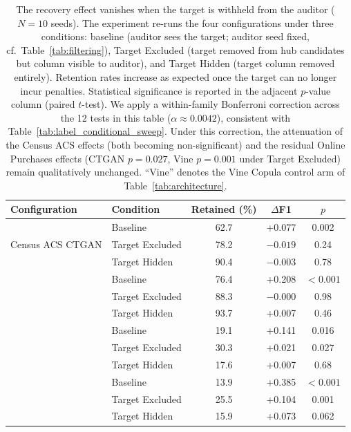 \documentclass[pdflatex,sn-mathphys-num]{sn-jnl}
\theoremstyle{thmstyleone}%
\theoremstyle{thmstyletwo}%
\theoremstyle{thmstylethree}%
\begin{document}
\begin{table}[htbp]
\centering
\caption{The recovery effect vanishes when the target is withheld from the auditor ($N=10$ seeds). The experiment re-runs the four configurations under three conditions: baseline (auditor sees the target; auditor seed fixed, cf.\ Table~\ref{tab:filtering}), Target Excluded (target removed from hub candidates but column visible to auditor), and Target Hidden (target column removed entirely). Retention rates increase as expected once the target can no longer incur penalties. Statistical significance is reported in the adjacent $p$-value column (paired $t$-test). We apply a within-family Bonferroni correction across the 12 tests in this table ($\alpha \approx 0.0042$), consistent with Table~\ref{tab:label_conditional_sweep}. Under this correction, the attenuation of the Census ACS effects (both becoming non-significant) and the residual Online Purchases effects (CTGAN $p=0.027$, Vine $p=0.001$ under Target Excluded) remain qualitatively unchanged. ``Vine'' denotes the Vine Copula control arm of Table~\ref{tab:architecture}.}
\label{tab:label_conditional_withheld}
\footnotesize
\setlength{\tabcolsep}{5pt}
\begin{tabular}{@{}llccc@{}}
\toprule
Configuration & Condition & Retained (\%) & $\Delta$F1 & $p$ \\
\midrule
\multirow{3}{*}{Census ACS CTGAN} & Baseline & 62.7 & +0.077 & 0.002 \\
 & Target Excluded & 78.2 & $-0.019$ & 0.24 \\
 & Target Hidden & 90.4 & $-0.003$ & 0.78 \\
\addlinespace
\multirow{3}{*}{Census ACS Vine} & Baseline & 76.4 & +0.208 & $<0.001$ \\
 & Target Excluded & 88.3 & $-0.000$ & 0.98 \\
 & Target Hidden & 93.7 & +0.007 & 0.46 \\
\addlinespace
\multirow{3}{*}{Online Purchases CTGAN} & Baseline & 19.1 & +0.141 & 0.016 \\
 & Target Excluded & 30.3 & +0.021 & 0.027 \\
 & Target Hidden & 17.6 & +0.007 & 0.68 \\
\addlinespace
\multirow{3}{*}{Online Purchases Vine} & Baseline & 13.9 & +0.385 & $<0.001$ \\
 & Target Excluded & 25.5 & +0.104 & 0.001 \\
 & Target Hidden & 15.9 & +0.073 & 0.062 \\
\bottomrule
\end{tabular}
\end{table}
\end{document}
